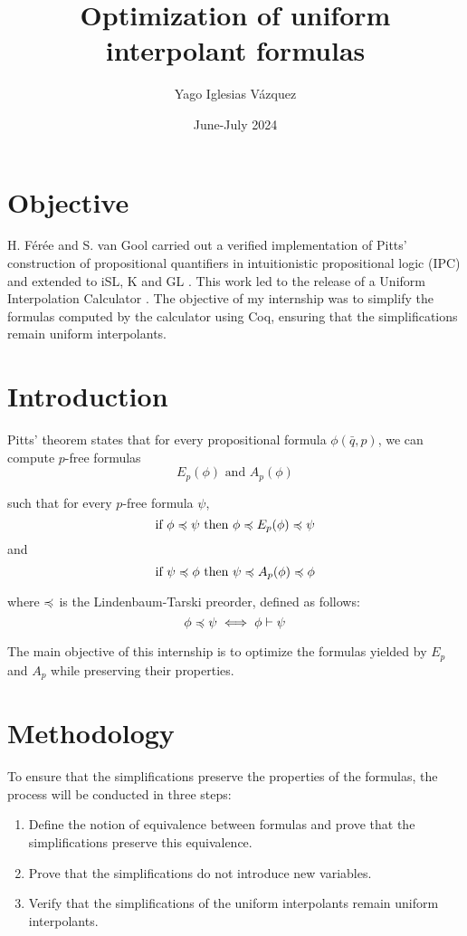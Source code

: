 \documentclass{article}
\title{Optimization of uniform interpolant formulas}
\author{Yago Iglesias Vázquez}
\date{June-July 2024}
\begin{document}
\maketitle

\section{Objective}

H. Férée and S. van Gool carried out a verified implementation of Pitts' \citep{pitts:interpolation} construction of propositional quantifiers in intuitionistic propositional
logic (IPC) \citep{feree_van-gool:computing_prop} and extended to iSL, K and GL \citep{feree_van-gool:ijcar}. This work led to the release of a Uniform Interpolation
Calculator \citep{github:uiml}. The objective of my internship was to simplify the formulas computed by the calculator using Coq, ensuring that the simplifications remain uniform interpolants.

\section{Introduction}

Pitts' theorem states that for every propositional formula $\phi (\bar{q}, p)$, we can compute $p$-free formulas
\[
	E_p (\phi) \text{ and } A_p (\phi)
\]

such that for every \(p\)-free formula \(\psi\),
\[
	\text{if } \phi \preccurlyeq \psi \text{ then } \phi \preccurlyeq E_p (\phi) \preccurlyeq \psi
\]
and
\[
	\text{if } \psi \preccurlyeq \phi \text{ then } \psi \preccurlyeq A_p (\phi) \preccurlyeq \phi
\]

where \(\preccurlyeq\) is the Lindenbaum-Tarski preorder, defined as follows:
\[
	\phi \preccurlyeq \psi \iff \phi \vdash \psi
\]

The main objective of this internship is to optimize the formulas yielded by $E_p$ and $A_p$ while preserving their properties.


\section{Methodology}

To ensure that the simplifications preserve the properties of the formulas, the process will be conducted in three steps:

\begin{enumerate}
	\item Define the notion of equivalence between formulas and prove that the simplifications preserve this equivalence.
	\item Prove that the simplifications do not introduce new variables.
	\item Verify that the simplifications of the uniform interpolants remain uniform interpolants.
\end{enumerate}
\end{document}
